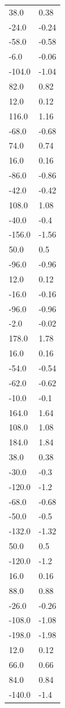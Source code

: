 \begin{longtable}{ll}
38.0 & 0.38 \\
-24.0 & -0.24 \\
-58.0 & -0.58 \\
-6.0 & -0.06 \\
-104.0 & -1.04 \\
82.0 & 0.82 \\
12.0 & 0.12 \\
116.0 & 1.16 \\
-68.0 & -0.68 \\
74.0 & 0.74 \\
16.0 & 0.16 \\
-86.0 & -0.86 \\
-42.0 & -0.42 \\
108.0 & 1.08 \\
-40.0 & -0.4 \\
-156.0 & -1.56 \\
50.0 & 0.5 \\
-96.0 & -0.96 \\
12.0 & 0.12 \\
-16.0 & -0.16 \\
-96.0 & -0.96 \\
-2.0 & -0.02 \\
178.0 & 1.78 \\
16.0 & 0.16 \\
-54.0 & -0.54 \\
-62.0 & -0.62 \\
-10.0 & -0.1 \\
164.0 & 1.64 \\
108.0 & 1.08 \\
184.0 & 1.84 \\
38.0 & 0.38 \\
-30.0 & -0.3 \\
-120.0 & -1.2 \\
-68.0 & -0.68 \\
-50.0 & -0.5 \\
-132.0 & -1.32 \\
50.0 & 0.5 \\
-120.0 & -1.2 \\
16.0 & 0.16 \\
88.0 & 0.88 \\
-26.0 & -0.26 \\
-108.0 & -1.08 \\
-198.0 & -1.98 \\
12.0 & 0.12 \\
66.0 & 0.66 \\
84.0 & 0.84 \\
-140.0 & -1.4 \\

\end{longtable}
